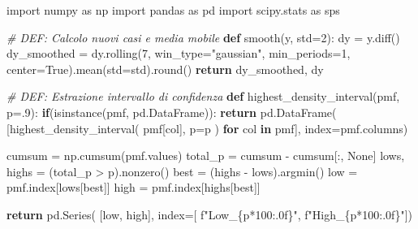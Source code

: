 \documentclass[11pt]{article}
\newenvironment{Shaded}{}{}
\newcommand{\KeywordTok}[1]{\textcolor[rgb]{0.00,0.44,0.13}{\textbf{{#1}}}}
\newcommand{\DecValTok}[1]{\textcolor[rgb]{0.25,0.63,0.44}{{#1}}}
\newcommand{\FloatTok}[1]{\textcolor[rgb]{0.25,0.63,0.44}{{#1}}}
\newcommand{\StringTok}[1]{\textcolor[rgb]{0.25,0.44,0.63}{{#1}}}
\newcommand{\CommentTok}[1]{\textcolor[rgb]{0.38,0.63,0.69}{\textit{{#1}}}}
\newcommand{\NormalTok}[1]{{#1}}
\newcommand{\SpecialCharTok}[1]{\textcolor[rgb]{0.25,0.44,0.63}{{#1}}}
\newcommand{\SpecialStringTok}[1]{\textcolor[rgb]{0.73,0.40,0.53}{{#1}}}
\newcommand{\ImportTok}[1]{{#1}}
\newcommand{\VariableTok}[1]{\textcolor[rgb]{0.10,0.09,0.49}{{#1}}}
\newcommand{\ControlFlowTok}[1]{\textcolor[rgb]{0.00,0.44,0.13}{\textbf{{#1}}}}
\newcommand{\OperatorTok}[1]{\textcolor[rgb]{0.40,0.40,0.40}{{#1}}}
\newcommand{\BuiltInTok}[1]{{#1}}
\begin{document}
    \begin{Shaded}
\begin{Highlighting}[]
\ImportTok{import}\NormalTok{ numpy }\ImportTok{as}\NormalTok{ np}
\ImportTok{import}\NormalTok{ pandas }\ImportTok{as}\NormalTok{ pd}
\ImportTok{import}\NormalTok{ scipy.stats }\ImportTok{as}\NormalTok{ sps}

\CommentTok{\# DEF: Calcolo nuovi casi e media mobile}
\KeywordTok{def}\NormalTok{ smooth(y, std}\OperatorTok{=}\DecValTok{2}\NormalTok{):}
\NormalTok{    dy }\OperatorTok{=}\NormalTok{ y.diff()}
\NormalTok{    dy\_smoothed }\OperatorTok{=}\NormalTok{ dy.rolling(}\DecValTok{7}\NormalTok{,}
\NormalTok{            win\_type}\OperatorTok{=}\StringTok{"gaussian"}\NormalTok{,}
\NormalTok{            min\_periods}\OperatorTok{=}\DecValTok{1}\NormalTok{,}
\NormalTok{            center}\OperatorTok{=}\VariableTok{True}\NormalTok{).mean(std}\OperatorTok{=}\NormalTok{std).}\BuiltInTok{round}\NormalTok{()}
    \ControlFlowTok{return}\NormalTok{ dy\_smoothed, dy}

\CommentTok{\# DEF: Estrazione intervallo di confidenza}
\KeywordTok{def}\NormalTok{ highest\_density\_interval(pmf, p}\OperatorTok{=}\FloatTok{.9}\NormalTok{):}
    \ControlFlowTok{if}\NormalTok{(}\BuiltInTok{isinstance}\NormalTok{(pmf, pd.DataFrame)):}
        \ControlFlowTok{return}\NormalTok{ pd.DataFrame(}
\NormalTok{            [highest\_density\_interval(}
\NormalTok{                pmf[col], p}\OperatorTok{=}\NormalTok{p}
\NormalTok{            ) }\ControlFlowTok{for}\NormalTok{ col }\KeywordTok{in}\NormalTok{ pmf],}
\NormalTok{            index}\OperatorTok{=}\NormalTok{pmf.columns)}
    
\NormalTok{    cumsum }\OperatorTok{=}\NormalTok{ np.cumsum(pmf.values)}
\NormalTok{    total\_p }\OperatorTok{=}\NormalTok{ cumsum }\OperatorTok{{-}}\NormalTok{ cumsum[:, }\VariableTok{None}\NormalTok{]}
\NormalTok{    lows, highs }\OperatorTok{=}\NormalTok{ (total\_p }\OperatorTok{\textgreater{}}\NormalTok{ p).nonzero()}
\NormalTok{    best }\OperatorTok{=}\NormalTok{ (highs }\OperatorTok{{-}}\NormalTok{ lows).argmin()}
\NormalTok{    low }\OperatorTok{=}\NormalTok{ pmf.index[lows[best]]}
\NormalTok{    high }\OperatorTok{=}\NormalTok{ pmf.index[highs[best]]}
    
    \ControlFlowTok{return}\NormalTok{ pd.Series(}
\NormalTok{        [low, high],}
\NormalTok{        index}\OperatorTok{=}\NormalTok{[}
            \SpecialStringTok{f"Low\_}\SpecialCharTok{\{p}\OperatorTok{*}\DecValTok{100}\SpecialCharTok{:.0f\}}\SpecialStringTok{"}\NormalTok{,}
            \SpecialStringTok{f"High\_}\SpecialCharTok{\{p}\OperatorTok{*}\DecValTok{100}\SpecialCharTok{:.0f\}}\SpecialStringTok{"}\NormalTok{])}


\end{Highlighting}
\end{Shaded}
\end{document}
